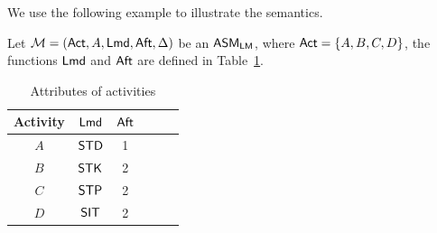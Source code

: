 We use the following example to illustrate the semantics.
\begin{example}
	Let ${\mathcal{M} } = ({\sf Act},A,{\sf Lmd},{\sf Aft},\Delta)$ be an $\textsf{ASM}_\textsf{LM}$, where ${\sf Act} = \{A,B,C,D\}$, the functions ${\sf Lmd}$ and ${\sf Aft}$ are defined in Table~\ref{tab-attribute}.
	\begin{table}[htbp]
		\begin{center}
		\begin{tabular}{|c|c|c|c|c|c|}
		\hline
		Activity & ${\sf Lmd}$ & ${\sf Aft}$\\
		\hline
		$A$ & $\mathsf{STD}$ & 1 \\
		\hline
		$B$ & $\mathsf{STK}$ & 2 \\
		\hline
		$C$ & $\mathsf{STP}$ & 2 \\
		\hline
		$D$ & $\mathsf{SIT}$ & 2 \\
		\hline
		\end{tabular}
		\caption{Attributes of activities}
		\label{tab-attribute}
		\end{center}
	\end{table}
			

\end{example}
